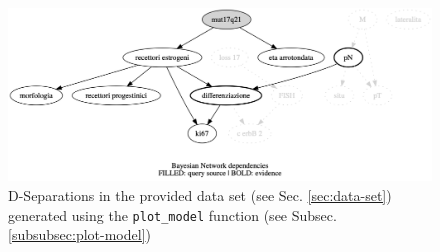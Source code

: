 \begin{figure}[htbp]
\centerline{\includegraphics[width=\columnwidth]{methodology/images/d-separation-example}}
\caption{D-Separations in the provided data set (see Sec. \ref{sec:data-set}) generated using the \texttt{plot\_model} function (see Subsec. \ref{subsubsec:plot-model})}
\label{fig:d-separation_example}
\end{figure}

